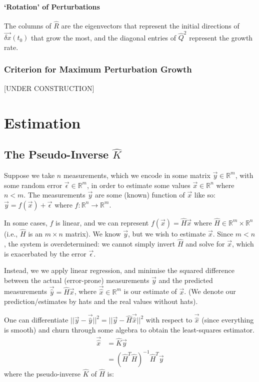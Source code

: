 \subsubsection{`Rotation' of Perturbations}


The columns of $\hat{R}$ are the eigenvectors that represent the initial directions of $\vec{\delta x}(t_0)$ that grow the most, and the diagonal entries of $\hat{Q}^2$ represent the growth rate.

\subsection{Criterion for Maximum Perturbation Growth}

[UNDER CONSTRUCTION]

\chapter{Estimation}\label{Estimation}

\section{The Pseudo-Inverse \texorpdfstring{$\hat{K}$}{K-hat}}

Suppose we take $n$ measurements, which we encode in some matrix $\vec{y}\in\mathbb{R}^m$, with some random error $\vec{\epsilon}\in\mathbb{R}^m$, in order to estimate some values $\vec{x}\in\mathbb{R}^n$ where $n<m$. The measurements $\vec{y}$ are some (known) function of $\vec{x}$ like so: $\vec{y}=f(\vec{x})+\vec{\epsilon}$ where $f:\mathbb{R}^n\to\mathbb{R}^m$.

In some cases, $f$ is linear, and we can represent $f(\vec{x})=\hat{H}\vec{x}$ where $\hat{H}\in\mathbb{R}^m\times\mathbb{R}^n$ (i.e., $\hat{H}$ is an $m\times n$ matrix). We know $\vec{y}$, but we wish to estimate $\vec{x}$. Since $m<n$, the system is overdetermined: we cannot simply invert $\hat{H}$ and solve for $\vec{x}$, which is exacerbated by the error $\vec{\epsilon}$.

Instead, we we apply linear regression, and minimise the squared difference between the actual (error-prone) measurements $\vec{y}$ and the predicted measurements $\vec{\hat{y}}=\hat{H}\vec{x}$, where $\vec{\hat{x}}\in\mathbb{R}^m$ is our estimate of $\vec{x}$. (We denote our prediction/estimates by hats and the real values without hats).

One can differentiate $||\vec{y}-\vec{\hat{y}}||^2=||\vec{y}-\hat{H}\vec{\hat{x}}||^2$ with respect to $\vec{\hat{x}}$ (since everything is smooth) and churn through some algebra to obtain the least-squares estimator.
\begin{align}
    \vec{\hat{x}}& =\hat{K}\vec{y} \\
    & = (\hat{H}^T\hat{H})^{-1}\hat{H}^T\vec{y}
\end{align}
where the pseudo-inverse $\hat{K}$ of $\hat{H}$ is:


